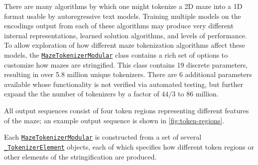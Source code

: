 \documentclass[10pt,a4paper,onecolumn]{article}
\let\origfigure\figure
\let\endorigfigure\endfigure
\renewenvironment{figure}[1][2] {
    \expandafter\origfigure\expandafter[H]
} {
    \endorigfigure
}
\begin{document}
There are many algorithms by which one might tokenize a 2D maze into a
1D format usable by autoregressive text models. Training multiple models
on the encodings output from each of these algorithms may produce very
different internal representations, learned solution algorithms, and
levels of performance. To allow exploration of how different maze
tokenization algorithms affect these models, the
\href{https://understanding-search.github.io/maze-dataset/maze_dataset/tokenization.html\#MazeTokenizerModular}{\texttt{MazeTokenizerModular}}
class contains a rich set of options to customize how mazes are
stringified. This class contains 19 discrete parameters, resulting in
over 5.8 million unique tokenizers. There are 6 additional parameters
available whose functionality is not verified via automated testing, but
further expand the the number of tokenizers by a factor of \(44/3\) to
86 million.

All output sequences consist of four token regions representing
different features of the maze; an example output sequence is shown in
\autoref{fig:token-regions}.

\begin{figure} 
  \centering
  \begin{minipage}{5in}
    \footnotesize
    
  \end{minipage}
  \caption{
    Example text output format with token regions highlighted.
    \colorbox[RGB]{ 217,210,233 }{Adjacency list}: text representation of the graph,
    \colorbox[RGB]{ 217,234,211 }{Origin}: starting coordinate,
    \colorbox[RGB]{ 234,209,220 }{Target}: ending coordinate,
    \colorbox[RGB]{ 207,226,243 }{Path}: maze solution sequence
  }
  \label{fig:token-regions}
\end{figure}

Each
\href{https://understanding-search.github.io/maze-dataset/maze_dataset/tokenization.html\#MazeTokenizerModular}{\texttt{MazeTokenizerModular}}
is constructed from a set of several
\href{https://understanding-search.github.io/maze-dataset/maze_dataset/tokenization.html\#_TokenizerElement}{\texttt{\_TokenizerElement}}
objects, each of which specifies how different token regions or other
elements of the stringification are produced.

\begin{figure}
    \centering
    
    \caption{Nested internal structure of \texttt{\_TokenizerElement} objects inside a typical \texttt{MazeTokenizerModular}.}
\end{figure}
\end{document}
